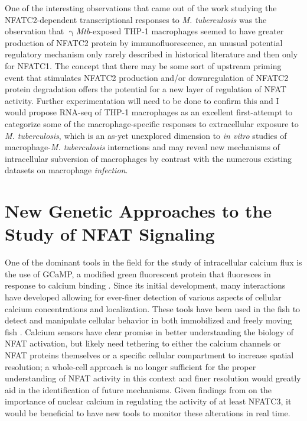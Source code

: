 One of the interesting observations that came out of the work studying the NFATC2\hyp{}dependent transcriptional responses to \textit{M. tuberculosis} was the observation that $\upgamma$\textit{Mtb}\hyp{}exposed THP\hyp{}1 macrophages seemed to have greater production of NFATC2 protein by immunofluorescence, an unusual potential regulatory mechanism only rarely described in historical literature \citep{Asagiri2005, Aramburu1995} and then only for NFATC1. The concept that there may be some sort of upstream priming event that stimulates NFATC2 production and/or downregulation of NFATC2 protein degradation offers the potential for a new layer of regulation of NFAT activity. Further experimentation will need to be done to confirm this and I would propose RNA\hyp{}seq of THP\hyp{}1 macrophages as an excellent first\hyp{}attempt to categorize some of the macrophage\hyp{}specific responses to extracellular exposure to \textit{M. tuberculosis}, which is an as\hyp{}yet unexplored dimension to \textit{in vitro} studies of macrophage\hyp{}\textit{M. tuberculosis} interactions and may reveal new mechanisms of intracellular subversion of macrophages by contrast with the numerous existing datasets on macrophage \textit{infection}.

\section{New Genetic Approaches to the Study of NFAT Signaling}\label{nfatgenetics}

One of the dominant tools in the field for the study of intracellular calcium flux is the use of GCaMP, a modified green fluorescent protein that fluoresces in response to calcium binding \citep{Nakai2001}. Since its initial development, many interactions have developed allowing for ever\hyp{}finer detection of various aspects of cellular calcium concentrations and localization. These tools have been used in the fish to detect and manipulate cellular behavior in both immobilized and freely moving fish \citep{Beerman2015, Kim2017}. Calcium sensors have clear promise in better understanding the biology of NFAT activation, but likely need tethering to either the calcium channels or NFAT proteins themselves or a specific cellular compartment to increase spatial resolution; a whole\hyp{}cell approach is no longer sufficient for the proper understanding of NFAT activity in this context and finer resolution would greatly aid in the identification of future mechanisms. Given findings from \citet{Kar2015} on the importance of nuclear calcium in regulating the activity of at least NFATC3, it would be beneficial to have new tools to monitor these alterations in real time. 

